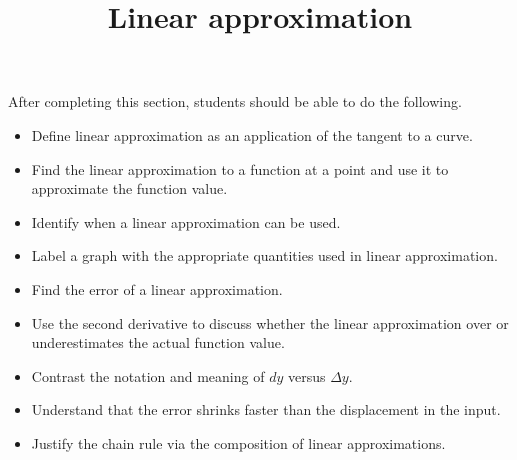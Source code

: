 \documentclass{ximera}
\title{Linear approximation}
\begin{document}
\begin{abstract}
\end{abstract}

\maketitle

\begin{sectionOutcomes}

After completing this section, students should be able to do the following.

\begin{itemize}
	\item Define linear approximation as an application of the tangent to a curve.
	\item Find the linear approximation to a function at a point and use it to approximate the function value.
	\item Identify when a linear approximation can be used.
	\item Label a graph with the appropriate quantities used in linear approximation.
	\item Find the error of a linear approximation.
	\item Use the second derivative to discuss whether the linear approximation over or underestimates the actual function value.
	\item Contrast the notation and meaning of $dy$ versus $\Delta y$.
	\item Understand that the error shrinks faster than the displacement in the input.
        \item Justify the chain rule via the composition of linear approximations.
\end{itemize}

\end{sectionOutcomes}
\end{document}
